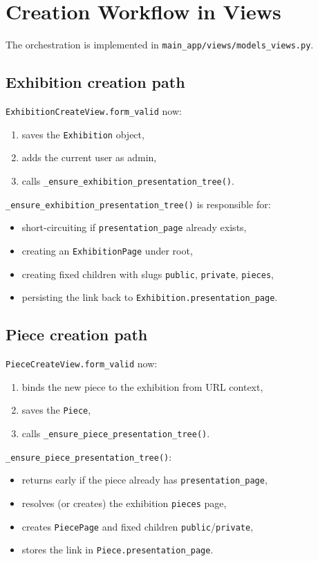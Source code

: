 \documentclass[11pt,a4paper]{article}
\begin{document}
\section{Creation Workflow in Views}
The orchestration is implemented in \texttt{main\_app/views/models\_views.py}.

\subsection{Exhibition creation path}
\texttt{ExhibitionCreateView.form\_valid} now:
\begin{enumerate}[leftmargin=*]
    \item saves the \texttt{Exhibition} object,
    \item adds the current user as admin,
    \item calls \texttt{\_ensure\_exhibition\_presentation\_tree()}.
\end{enumerate}

\texttt{\_ensure\_exhibition\_presentation\_tree()} is responsible for:
\begin{itemize}[leftmargin=*]
    \item short-circuiting if \texttt{presentation\_page} already exists,
    \item creating an \texttt{ExhibitionPage} under root,
    \item creating fixed children with slugs \texttt{public}, \texttt{private}, \texttt{pieces},
    \item persisting the link back to \texttt{Exhibition.presentation\_page}.
\end{itemize}

\subsection{Piece creation path}
\texttt{PieceCreateView.form\_valid} now:
\begin{enumerate}[leftmargin=*]
    \item binds the new piece to the exhibition from URL context,
    \item saves the \texttt{Piece},
    \item calls \texttt{\_ensure\_piece\_presentation\_tree()}.
\end{enumerate}

\texttt{\_ensure\_piece\_presentation\_tree()}:
\begin{itemize}[leftmargin=*]
    \item returns early if the piece already has \texttt{presentation\_page},
    \item resolves (or creates) the exhibition \texttt{pieces} page,
    \item creates \texttt{PiecePage} and fixed children \texttt{public}/\texttt{private},
    \item stores the link in \texttt{Piece.presentation\_page}.
\end{itemize}
\end{document}
